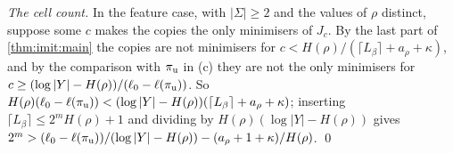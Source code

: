 \emph{The cell count.} In the feature case, with $|\Sigma|\ge2$ and the values of $\rho$ distinct, suppose some $c$ makes the copies the only minimisers of $J_c$. By the last part of \cref{thm:imit:main} the copies are not minimisers for $c<H(\rho)/(\lceil L_\beta\rceil+a_\rho+\kappa)$, and by the comparison with $\pi_{\rm u}$ in (c) they are not the only minimisers for $c\ge(\log|Y|-H(\rho))/(\ell_0-\ell(\pi_{\rm u}))$. So $H(\rho)(\ell_0-\ell(\pi_{\rm u}))<(\log|Y|-H(\rho))(\lceil L_\beta\rceil+a_\rho+\kappa)$; inserting $\lceil L_\beta\rceil\le2^mH(\rho)+1$ and dividing by $H(\rho)(\log|Y|-H(\rho))$ gives $2^m>(\ell_0-\ell(\pi_{\rm u}))/(\log|Y|-H(\rho))-(a_\rho+1+\kappa)/H(\rho)$. \qed
